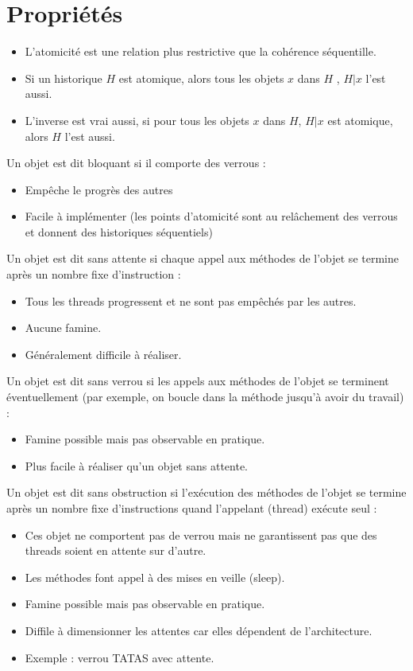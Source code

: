 \documentclass[11pt,a4paper]{report}
\begin{document}
\section*{Propriétés}

\begin{itemize}
    \item L'atomicité est une relation plus restrictive que la cohérence séquentille.
    \item Si un historique $H$ est atomique, alors tous les objets $x$ dans $H$ , $H|x$ l'est aussi.
    \item L'inverse est vrai aussi, si pour tous les objets $x$ dans $H$, $H|x$ est atomique, alors $H$ l'est aussi.
\end{itemize}

Un objet est dit bloquant si il comporte des verrous :
\begin{itemize}
    \item Empêche le progrès des autres
    \item Facile à implémenter (les points d'atomicité sont au relâchement des verrous et donnent des historiques séquentiels)
\end{itemize}

Un objet est dit sans attente si chaque appel aux méthodes de l'objet se termine après un nombre fixe d'instruction :
\begin{itemize}
    \item Tous les threads progressent et ne sont pas empêchés par les autres.
    \item Aucune famine.
    \item Généralement difficile à réaliser.
\end{itemize}

Un objet est dit sans verrou si les appels aux méthodes de l'objet se terminent éventuellement (par exemple, on boucle dans la méthode jusqu'à avoir du travail) :
\begin{itemize}
    \item Famine possible mais pas observable en pratique.
    \item Plus facile à réaliser qu'un objet sans attente.
\end{itemize}

Un objet est dit sans obstruction si l'exécution des méthodes de l'objet se termine après un nombre fixe d'instructions quand l'appelant (thread) exécute seul :
\begin{itemize}
    \item Ces objet ne comportent pas de verrou mais ne garantissent pas que des threads soient en attente sur d'autre.
    \item Les méthodes font appel à des mises en veille (sleep).
    \item Famine possible mais pas observable en pratique.
    \item Diffile à dimensionner les attentes car elles dépendent de l'architecture.
    \item Exemple : verrou TATAS avec attente.
\end{itemize}


\end{document}
